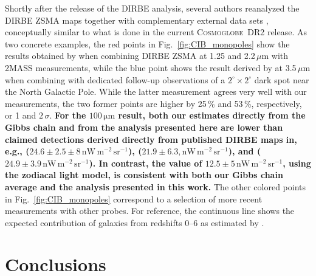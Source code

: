 \documentclass{aa}
\newcommand{\nWmsr}{\mathrm{nW}\,\mathrm{m}^{-2}\,\mathrm{sr}^{-1}}
\newcommand{\cosmoglobe}{\textsc{Cosmoglobe}}
\begin{document}
Shortly after the release of the DIRBE analysis, several authors
reanalyzed the DIRBE ZSMA maps together with complementary external
data sets \citep[e.g.,][]{wright:2000,wright:2001}, conceptually
similar to what is done in the current \cosmoglobe\ DR2 release. As
two concrete examples, the red points in Fig.~\ref{fig:CIB_monopoles}
show the results obtained by \citet{cambresy:2001} when combining
DIRBE ZSMA at 1.25 and 2.2$\,\mu\mathrm{m}$ with 2MASS measurements,
while the blue point shows the result derived by \citet{gorjian:2000}
at 3.5$\,\mu\mathrm{m}$ when combining with dedicated follow-up
observations of a $2^{\circ}\times2^{\circ}$ dark spot near the North
Galactic Pole. While the latter measurement agrees very well with our
measurements, the two former points are higher by 25\,\% and 53\,\%,
respectively, or 1 and $2\,\sigma$. 
\textbf{For the $100\,\mathrm{\mu m}$ result, both our estimates directly from the Gibbs chain and from the analysis presented here are lower than claimed detections derived directly from published DIRBE maps in, e.g., \citet{finkbeiner2000} ($24.6\pm2.5\pm 8\,\nWmsr$), \citet{lagache2000} ($21.9\pm6.3,\nWmsr$), and \citet{casandjian2024} ($24.9\pm3.9\,\nWmsr$). 
In contrast, the \citet{wright2004} value of $12.5\pm5\,\nWmsr$, 
using the \citet{gorjian:2000} zodiacal light model, 
is consistent with both our Gibbs chain average and the analysis presented in this work.}
The other colored points in
Fig.~\ref{fig:CIB_monopoles} correspond to a selection of more recent
measurements with other probes. For reference, the continuous line
shows the expected contribution of galaxies from redshifts 0--6 as
estimated by \citet{finke2022}. 





































\section{Conclusions}
\label{sec:conclusions}
\end{document}
